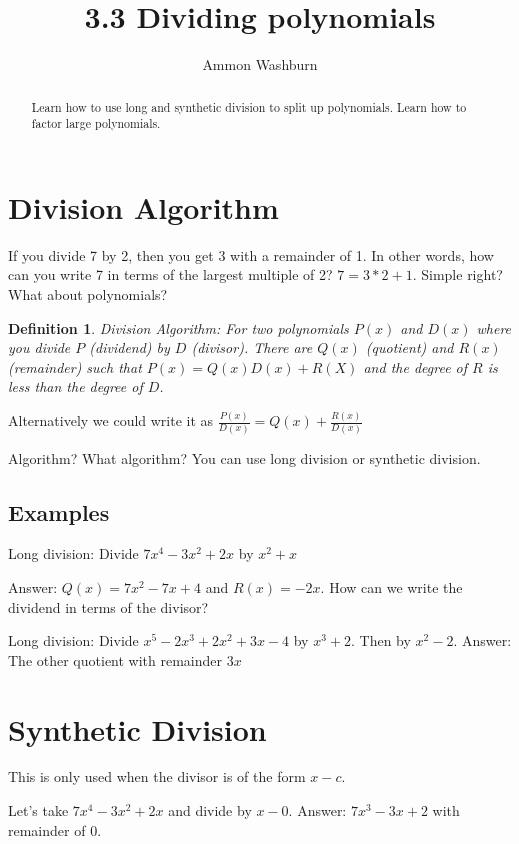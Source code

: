 \documentclass{tufte-handout}
\title{3.3 Dividing polynomials}
\author[AW]{Ammon Washburn}
\newtheorem{mydef}{Definition}
\begin{document}
\maketitle

\begin{abstract}
Learn how to use long and synthetic division to split up polynomials.  Learn how to factor large polynomials.
\end{abstract}

\section{Division Algorithm}

If you divide 7 by 2, then you get 3 with a remainder of 1.  In other words, how can you write 7 in terms of the largest multiple of 2?  $7 = 3 * 2 + 1$.  Simple right?  What about polynomials?


\begin{mydef}
Division Algorithm: For two polynomials $P(x)$ and $D(x)$ where you divide $P$ (dividend) by $D$ (divisor).  There are $Q(x)$ (quotient) and $R(x)$ (remainder) such that $P(x) = Q(x)D(x) + R(X)$ and the degree of $R$ is less than the degree of $D$.
\end{mydef}

Alternatively we could write it as $\frac{P(x)}{D(x)}= Q(x) + \frac{R(x)}{D(x)}$

Algorithm? What algorithm?  You can use long division or synthetic division.

\subsection{Examples}

Long division: Divide $7x^4-3x^2+2x$ by $x^2+x$

Answer: $Q(x) = 7x^2-7x+4$ and $R(x) = -2x$.  How can we write the dividend in terms of the divisor?

Long division: Divide $x^5-2x^3+2x^2+3x-4$ by $x^3+2$.  Then by $x^2-2$.  Answer: The other quotient with remainder $3x$

\section{Synthetic Division}

This is only used when the divisor is of the form $x-c$.  

Let's take $7x^4-3x^2+2x$ and divide by $x - 0$.  Answer: $7x^3-3x+2$ with remainder of $0$.
\end{document}
